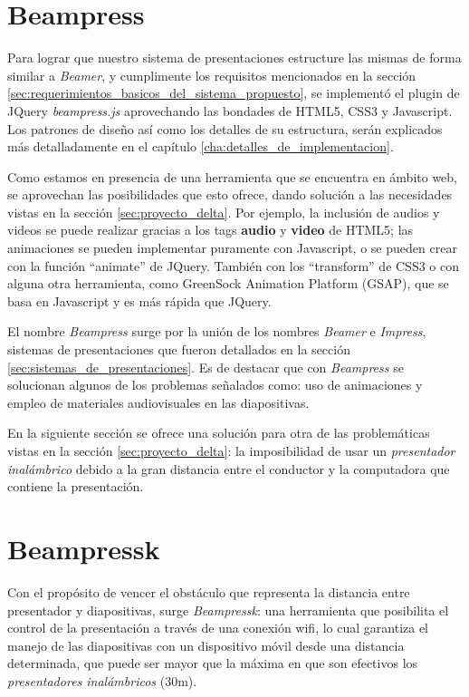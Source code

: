 	\section{Beampress} %
	\label{sec:beampress}
		Para lograr que nuestro sistema de presentaciones estructure las mismas de forma similar a \textit{Beamer}, y cumplimente los requisitos mencionados en la sección \ref{sec:requerimientos_basicos_del_sistema_propuesto}, se implementó el plugin de JQuery \textit{beampress.js} aprovechando las bondades de HTML5, CSS3 y Javascript. Los patrones de diseño así como los detalles de su estructura, serán explicados más detalladamente en el capítulo \ref{cha:detalles_de_implementacion}.


		Como estamos en presencia de una herramienta que se encuentra en ámbito web, se aprovechan las posibilidades que esto ofrece, dando solución a las necesidades vistas en la sección \ref{sec:proyecto_delta}. Por ejemplo, la inclusión de audios y videos se puede realizar gracias a los tags \textbf{audio} y \textbf{video} de HTML5; las animaciones se pueden implementar puramente con Javascript, o se pueden crear con la función ``animate'' de JQuery. También con los ``transform'' de CSS3 o con alguna otra herramienta, como GreenSock Animation Platform (GSAP), que se basa en Javascript y es más rápida que JQuery. 


		El nombre \textit{Beampress} surge por la unión de los nombres \textit{Beamer} e \textit{Impress}, sistemas de presentaciones que fueron detallados en la sección \ref{sec:sistemas_de_presentaciones}. Es de destacar que con \textit{Beampress} se solucionan algunos de los problemas señalados como: uso de animaciones y empleo de materiales audiovisuales en las diapositivas.	

	En la siguiente sección se ofrece una solución para otra de las problemáticas vistas en la sección \ref{sec:proyecto_delta}: la imposibilidad de usar un \textit{presentador inalámbrico} debido a la gran distancia entre el conductor y la computadora que contiene la presentación.
	
	\section{Beampressk} %
	\label{sec:beampressk}
		Con el propósito de vencer el obstáculo que representa la distancia entre presentador y diapositivas, surge \textit{Beampressk}: una herramienta que posibilita el control de la presentación a través de una conexión wifi, lo cual garantiza el manejo de las diapositivas con un dispositivo móvil desde una distancia determinada, que puede ser mayor que la máxima en que son efectivos los \textit{presentadores inalámbricos} (30m).

